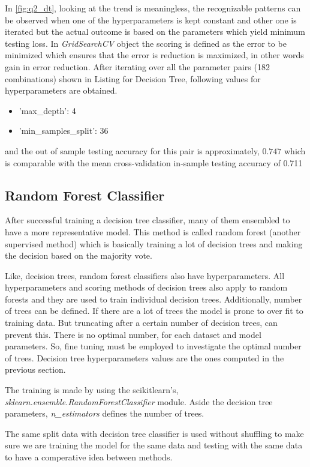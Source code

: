 \documentclass[11pt]{article}
\begin{document}
In \ref{fig:q2_dt}, looking at the trend is meaningless, the recognizable patterns can be observed when one of the hyperparameters is kept constant and other one is iterated but the actual outcome is based on the parameters which yield minimum testing loss. In \emph{GridSearchCV} object the scoring is defined as the error to be minimized which ensures that the error is reduction is maximized, in other words gain in error reduction. After iterating over all the parameter pairs (182 combinations) shown in Listing for Decision Tree, following values for hyperparameters are obtained.
\begin{itemize}
    \item 'max\_depth': 4 
    \item 'min\_samples\_split': 36
\end{itemize}

and the out of sample testing accuracy for this pair is approximately, $\bm{0.747}$ which is comparable with the mean cross-validation in-sample testing accuracy of 0.711

\subsection{Random Forest Classifier}
After successful training a decision tree classifier, many of them ensembled to have a more representative model. This method is called random forest (another supervised method) which is basically training a lot of decision trees and making the decision based on the majority vote. \medskip

Like, decision trees, random forest classifiers also have hyperparameters. All hyperparameters and scoring methods of decision trees also apply to random forests and they are used to train individual decision trees. Additionally, number of trees can be defined. If there are a lot of trees the model is prone to over fit to training data. But truncating after a certain number of decision trees, can prevent this. There is no optimal number, for each dataset and model parameters. So, fine tuning must be employed to investigate the optimal number of trees. Decision tree hyperparameters values are the ones computed in the previous section.\medskip

The training is made by using the scikitlearn's, \emph{sklearn.ensemble.RandomForestClassifier} module. Aside the decision tree parameters, \emph{n\_estimators} defines the number of trees.\medskip

The same split data with decision tree classifier is used without shuffling to make sure we are training the model for the same data and testing with the same data to have a comperative idea between methods. \medskip
\end{document}
